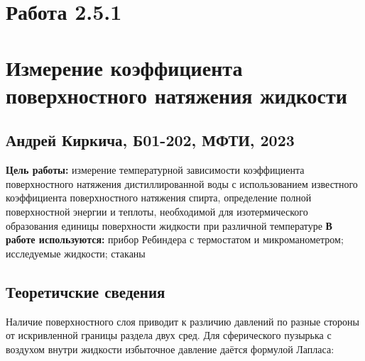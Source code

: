 


	\section*{Работа 2.5.1}	
	\section*{Измерение коэффициента поверхностного натяжения жидкости}
	\subsection*{Андрей Киркича, Б01-202, МФТИ, 2023}
	\n
	\textbf{Цель работы: }
	измерение температурной зависимости  коэффициента поверхностного натяжения дистиллированной воды с использованием известного коэффициента поверхностного натяжения спирта, определение полной поверхностной энергии  и теплоты, необходимой для изотермического образования единицы  поверхности жидкости  при различной температуре
	\n\n
	\textbf{В работе используются: }
	прибор Ребиндера с термостатом и микроманометром; исследуемые жидкости; стаканы
	\n\n
	\subsection*{Теоретичские сведения}\n
	Наличие поверхностного слоя приводит к различию давлений по разные стороны от искривленной границы раздела двух сред.  Для сферического пузырька с воздухом  внутри жидкости избыточное давление даётся формулой Лапласа:\n
